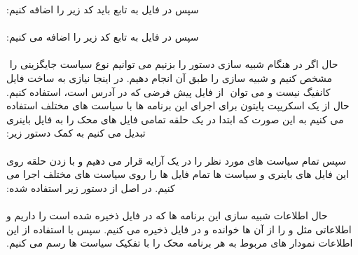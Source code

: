 ‫سپس در فایل  به تابع  باید کد زیر را اضافه کنیم:\\
‫\\
‫    سپس در فایل  به تابع  کد زیر را اضافه می کنیم:\\
‫    \\
‫حال اگر در هنگام شبیه سازی دستور  را بزنیم می توانیم نوع سیاست جایگزینی را 
‫ مشخص کنیم و شبیه سازی را طبق آن انجام دهیم. در اینجا نیازی به ساخت فایل کانفیگ نیست و می توان 
‫ از فایل پیش فرضی که در آدرس  است، استفاده کنیم.\\
‫حال از یک اسکریپت پایتون برای اجرای این برنامه ها با سیاست های مختلف استفاده می کنیم به این صورت 
‫که ابتدا در یک حلقه تمامی فایل های محک را به فایل باینری تبدیل می کنیم به کمک دستور زیر:\\
‫\\
‫سپس تمام سیاست های مورد نظر را در یک آرایه قرار می دهیم و با زدن حلقه روی این فایل های باینری و سیاست ها تمام فایل ها را روی سیاست های مختلف اجرا می کنیم. در اصل از دستور زیر استفاده شده:\\
‫\\
‫حال اطلاعات شبیه سازی این برنامه ها که در فایل  ذخیره شده است را داریم و اطلاعاتی مثل  و  را از آن ها خوانده و در فایل  ذخیره می کنیم. سپس با استفاده از این اطلاعات نمودار های مربوط به هر برنامه محک را با تفکیک سیاست ها رسم می کنیم.\\
